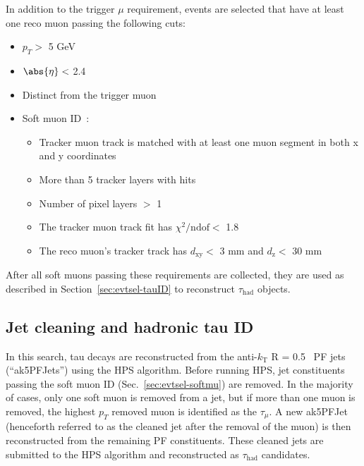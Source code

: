 In addition to the trigger $\mu$ requirement, events are selected that have at least one reco muon passing the following cuts:
\begin{itemize}
	\item $p_T >$ 5 GeV
	\item $\abs{\eta} <$ 2.4
	\item Distinct from the trigger muon
	\item Soft muon ID~\cite{CMS:2010uta}:
	\begin{itemize}
		\item Tracker muon track is matched with at least one muon segment in both \unit{x} and y coordinates
		\item More than 5 tracker layers with hits
		\item Number of pixel layers $>$ 1
		\item The tracker muon track fit has $\chi^{2}/\text{ndof} <$ 1.8
		\item The reco muon's tracker track has $d_{\text{xy}} <$ 3 mm and $d_{\text{z}} <$ 30 mm
	\end{itemize}
\end{itemize}
After all soft muons passing these requirements are collected, they are used as described in Section~\ref{sec:evtsel-tauID} to reconstruct $\tau_{\text{had}}$ objects.

\subsection{Jet cleaning and hadronic tau ID\label{sec:evtsel-tauID}}

In this search, tau decays are reconstructed from the anti-$k_{\text{T}}$ R = 0.5~\cite{1126-6708-2008-04-063} PF jets (``ak5PFJets'') using the HPS algorithm. Before running HPS, jet constituents passing the soft muon ID (Sec.~\ref{sec:evtsel-softmu}) are removed. In the majority of cases, only one soft muon is removed from a jet, but if more than one muon is removed, the highest $p_T$ removed muon is identified as the $\tau_{\mu}$. A new ak5PFJet (henceforth referred to as the cleaned jet after the removal of the muon) is then reconstructed from the remaining PF constituents. These cleaned jets are submitted to the HPS algorithm and reconstructed as $\tau_{\text{had}}$ candidates.

